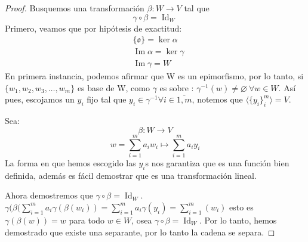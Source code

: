 \documentclass[14pt]{extarticle} %
\theoremstyle{problemastyle} %
\newcommand{\cero}{\mathfrak{o}} %
\DeclareMathOperator{\im}{Im}
\DeclareMathOperator{\id}{Id}
\begin{document}
\begin{proof}
    Busquemos una transformación $\beta: W \longrightarrow V $ tal que 
    $$\gamma \circ \beta = \id_W $$
    Primero, veamos que por hipótesis de exactitud:
    \begin{align*}
        &\{\cero\} = \ker \alpha\\
        &\im \alpha = \ker \gamma\\
        &\im \gamma = W
    \end{align*}
    En primera instancia, podemos afirmar que W es un epimorfismo, por lo tanto, si $\{w_1,w_2,w_3,\ldots, w_m\}$ es base de W, como $\gamma$ es sobre : $ \gamma^{-1}(w) \neq  \varnothing \: \forall w \in W$. Así pues, escojamos un $y_i$ fijo tal que $y_i \in \gamma^{-1} \forall i \in \overline{1,m}$, notemos que $\langle \{ y_i \}_i^m \rangle = V$.

    Sea:
    $$\beta: W \longrightarrow V $$
    $$w = \sum_{i=1}^m a_i w_i \longmapsto \sum_{i=1}^{m} a_i y_i $$
    La forma en que hemos escogido las $y_i$s nos garantiza que es una función bien definida, además es fácil demostrar que es una transformación lineal.

    Ahora demostremos que $\gamma \circ \beta = \id_W$.
    $\gamma(\beta(\sum_{i=1}^{m} a_i \gamma( \beta ( w_i))= \sum_{i=1}^{m} a_i \gamma(y_i) = \sum_{i=1}^{m} (w_i)$
    esto es $\gamma(\beta(w))=w$ para todo $w\in W$, osea $\gamma \circ \beta = \id_W$. Por lo tanto, hemos demostrado que existe una separante, por lo tanto la cadena se separa.
    
\end{proof}
\end{document}
